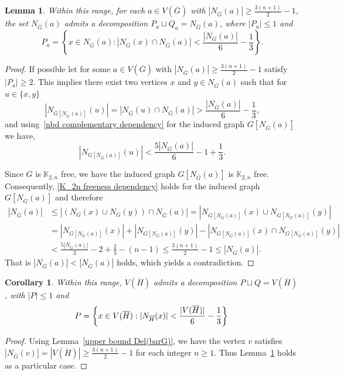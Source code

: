 \documentclass[reqno,10pt]{amsart}
\newtheorem{corollary}[theorem]{Corollary}
\newtheorem{lemma}[theorem]{Lemma}
\theoremstyle{definition}
\begin{document}
\begin{lemma}\label{general decomposition lemma}
Within this range, for each $a\in V(\overline{G})$ with $|N_{\overline{G}}(a)|\geq\frac{3(n+1)}{2}-1$, the set $N_{\overline{G}}(a)$   admits a decomposition $P_{a}\sqcup Q_{a}=N_{\overline{G}}(a)$, where $|P_{a}|\leq 1$ and
\begin{equation*}
 P_{a}=\left\{x\in N_{\overline{G}}(a):|N_{\overline{G}}(x)\cap N_{\overline{G}}(a)|<\frac{|N_{\overline{G}}(a)|}{6}-\frac{1}{3}\right\}.   
\end{equation*}
\end{lemma}
\begin{proof}
If possible let for some $a\in V(\overline{G})$ with $|N_{\overline{G}}(a)|\geq\frac{3(n+1)}{2}-1$ satisfy $|P_{a}|\geq2$. This implies there exist two vertices $x$ and $y\in N_{\overline{G}}(a)$ such that for $u\in\{x,y\}$
\begin{equation*}
 |N_{\overline{G}[N_{\overline{G}}(a)]}(u)|=|N_{\overline{G}}(u)\cap N_{\overline{G}}(a)|>\frac{|N_{\overline{G}}(a)|}{6}-\frac{1}{3},  \end{equation*}
and using~\eqref{nbd complementary dependency} for the induced graph $G[N_{\overline{G}}(a)]$ we have, 
\begin{equation*}
 |N_{G[N_{\overline{G}}(a)]}(u)|<\frac{5|N_{\overline{G}}(a)|}{6}-1+\frac{1}{3}.
 \end{equation*}

Since $G$ is $\mathbb{K}_{2,n}$ free, we have the induced graph $G[N_{\overline{G}}(a)]$ is $\mathbb{K}_{2,n}$ free. Consequently, \eqref{K_2n freeness dependency} holds for the induced graph $G[N_{\overline{G}}(a)]$ and therefore 
\begin{align*}
|N_{\overline{G}}(a)|&\leq|\left(N_{G}(x)\cup N_{G}(y)\right)\cap N_{\overline{G}}(a)|=|N_{G[N_{\overline{G}}(a)]}(x)\cup N_{G[N_{\overline{G}}(a)]}(y)|\\
&=|N_{G[N_{\overline{G}}(a)]}(x)|+|N_{G[N_{\overline{G}}(a)]}(y)|-|N_{G[N_{\overline{G}}(a)]}(x)\cap N_{G[N_{\overline{G}}(a)]}(y)|\\
&<\frac{5|N_{\overline{G}}(a)|}{3}-2+\frac{2}{3}-(n-1)\leq\frac{3(n+1)}{2}-1\leq|N_{\overline{G}}(a)|. 
\end{align*}
That is $|N_{\overline{G}}(a)|<|N_{\overline{G}}(a)|$ holds, which yields a contradiction.      
 \end{proof}

\begin{corollary}\label{decomposition lemma 2}
Within this range,  $V(\overline{H})$ admits a decomposition $P\sqcup Q=V(\overline{H})$, with $|P|\leq1$ and 
\begin{equation*}
P=\left\{x\in V(\overline{H}): |N_{\overline{H}}(x)|<\frac{|V(\overline{H})|}{6}-\frac{1}{3}\right\}\\
\end{equation*}
\end{corollary}
\begin{proof}
Using Lemma~\ref{upper bound Del(barG)}, we have the vertex $v$ satisfies $|N_{\overline{G}}(v)|=|V(\overline{H})|\geq\frac{3(n+1)}{2}-1$ for each integer $n\geq1$. Thus Lemma~\ref{general decomposition lemma} holds as a particular case.   
\end{proof}
\end{document}
